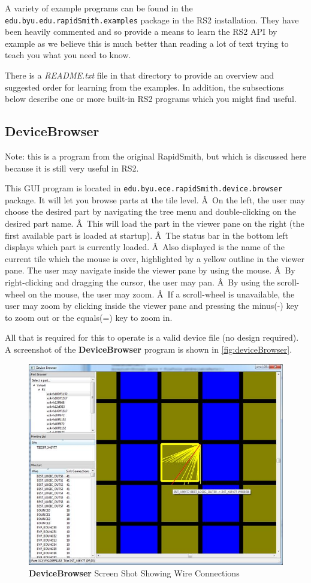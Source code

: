 \documentclass[12pt]{article}
\newcommand{\fil}[1]{{\em #1}}
\newcommand{\pkg}[1]{{\texttt{#1}}}
\newcommand{\pgm}[1]{{\textbf{#1}}}
\begin{document}
A variety of example programs can be found in the
\pkg{edu.byu.edu.rapidSmith.examples} package in the RS2 installation.
They have been heavily commented and so provide a means to learn the RS2 API by
example as we believe this is much better than reading a lot of text trying to
teach you what you need to know.

There is a \fil{README.txt} file in that directory to provide an overview and
suggested order for learning from the examples.
In addition, the subsections below describe one or more built-in RS2 programs
which you might find useful.

\subsection{\pgm{DeviceBrowser}}
Note: this is a program from the original RapidSmith, but which is discussed
here because it is still very useful in RS2. 

This GUI program is located in \pkg{edu.byu.ece.rapidSmith.device.browser}
package.  It will let you browse parts at the tile level. Â On the left, the user
may choose the desired part by navigating the tree menu and double-clicking on
the desired part name. Â This will load the part in the viewer pane on the right
(the first available part is loaded at startup). Â The status bar in the bottom
left displays which part is currently loaded. Â Also displayed is the name of the
current tile which the mouse is over, highlighted by a yellow outline in the
viewer pane. The user may navigate inside the viewer pane by using the mouse.
Â By right-clicking and dragging the cursor, the user may pan. Â By using the
scroll-wheel on the mouse, the user may zoom. Â If a scroll-wheel is unavailable,
the user may zoom by clicking inside the viewer pane and pressing the minus(-)
key to zoom out or the equals(=) key to zoom in.

All that is required for this to operate is a valid device file (no design
required). A screenshot of the \pgm{DeviceBrowser} program is shown in
\autoref{fig:deviceBrowser}.

\begin{figure}[htb]
\centering
\includegraphics[width=0.8\columnwidth]{deviceBrowser2}
\caption{\pgm{DeviceBrowser} Screen Shot Showing Wire Connections}
\label{fig:deviceBrowser2}
\end{figure}
\end{document}
